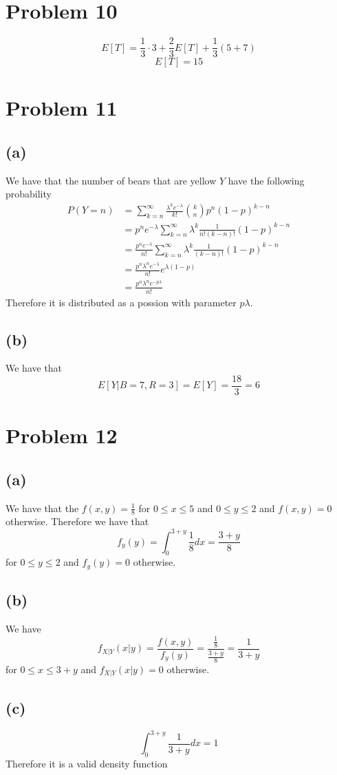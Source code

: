 \section*{Problem 10}
$$E[T]=\frac{1}{3}\cdot 3+\frac{2}{3}E[T]+\frac{1}{3}(5+7)$$
$$E[T]=15$$
\section*{Problem 11}
\subsection*{(a)}
We have that the number of bears that are yellow $Y$ have the following probability
\begin{align*}
    P(Y=n)&=\sum_{k=n}^{\infty} \frac{\lambda^k e^{-\lambda}}{k!}{
        k\choose n} p^n (1-p)^{k-n}\\
        &=p^ne^{-\lambda}\sum_{k=n}^{\infty}\lambda^{k} \frac{1}{n!(k-n)!}(1-p)^{k-n}\\
        &=\frac{p^ne^{-\lambda}}{n!}\sum_{k=n}^{\infty}\lambda^{k} \frac{1}{(k-n)!}(1-p)^{k-n}\\
        &=\frac{p^n\lambda^ne^{-\lambda}}{n!}e^{\lambda(1-p)}\\
        &=\frac{p^n\lambda^ne^{-p\lambda}}{n!}
\end{align*}
Therefore it is distributed as a possion with parameter $p\lambda$.
\subsection*{(b)}
We have that 
$$E[Y|B=7,R=3]=E[Y]=\frac{18}{3}=\boxed{6}$$
\section*{Problem 12}
\subsection{(a)}
We have that the $f(x,y)=\frac{1}{8}$ for $0\leq x\leq 5$ and $0\leq y\leq 2$ and $f(x,y)=0$ otherwise.
Therefore we have that 
$$f_y(y)=\int_{0}^{3+y}\frac{1}{8}dx=\frac{3+y}{8}$$
for $0\leq y\leq 2$ and $f_y(y)=0$ otherwise.
\subsection{(b)}
We have
$$f_{X|Y}(x|y)=\frac{f(x,y)}{f_y(y)}=\frac{\frac{1}{8}}{\frac{3+y}{8}}=\frac{1}{3+y}$$
for $0\leq x\leq 3+y$ and $f_{X|Y}(x|y)=0$ otherwise.
\subsection{(c)}
$$\int_{0}^{3+y}\frac{1}{3+y}dx=1$$
Therefore it is a valid density function
